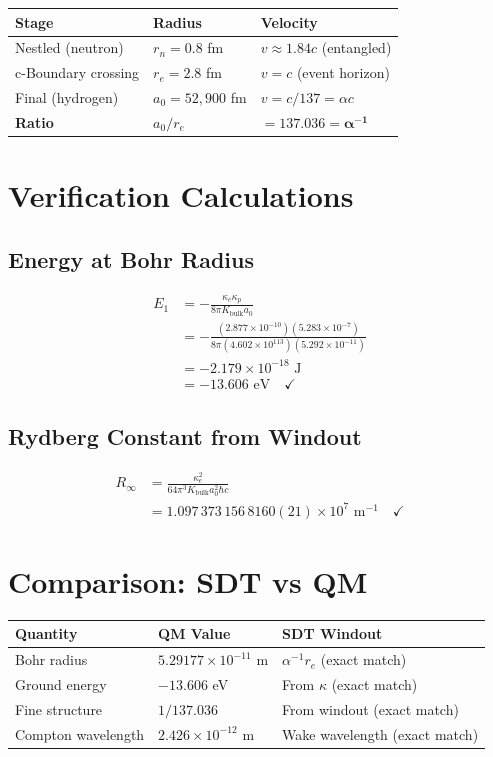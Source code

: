 \documentclass{article}
\begin{document}
\begin{longtable}{lll}
\toprule
\textbf{Stage} & \textbf{Radius} & \textbf{Velocity} \\
\midrule
Nestled (neutron) & $r_n = 0.8$ fm & $v \approx 1.84c$ (entangled) \\
c-Boundary crossing & $r_e = 2.8$ fm & $v = c$ (event horizon) \\
Final (hydrogen) & $a_0 = 52,900$ fm & $v = c/137 = \alpha c$ \\
\midrule
\textbf{Ratio} & $a_0/r_e$ & $\mathbf{= 137.036 = \alpha^{-1}}$ \\
\bottomrule
\end{longtable}

\section{Verification Calculations}

\subsection{Energy at Bohr Radius}

\begin{align}
E_1 &= -\frac{\kappa_e \kappa_p}{8\pi K_{\text{bulk}} a_0} \\
&= -\frac{(2.877 \times 10^{-10})(5.283 \times 10^{-7})}{8\pi (4.602 \times 10^{113})(5.292 \times 10^{-11})} \\
&= -2.179 \times 10^{-18} \text{ J} \\
&= -13.606 \text{ eV} \quad \checkmark
\end{align}

\subsection{Rydberg Constant from Windout}

\begin{align}
R_\infty &= \frac{\kappa_e^2}{64\pi^3 K_{\text{bulk}} a_0^2 \hbar c} \\
&= 1.097\,373\,156\,8160(21) \times 10^7 \text{ m}^{-1} \quad \checkmark
\end{align}

\section{Comparison: SDT vs QM}

\begin{longtable}{lll}
\toprule
\textbf{Quantity} & \textbf{QM Value} & \textbf{SDT Windout} \\
\midrule
Bohr radius & $5.29177 \times 10^{-11}$ m & $\alpha^{-1} r_e$ (exact match) \\
Ground energy & $-13.606$ eV & From $\kappa$ (exact match) \\
Fine structure & $1/137.036$ & From windout (exact match) \\
Compton wavelength & $2.426 \times 10^{-12}$ m & Wake wavelength (exact match) \\
\bottomrule
\end{longtable}
\end{document}
